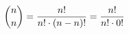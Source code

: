 \documentclass[preview]{standalone}
\begin{document}
\begin{align*}
\special{dvisvgm:raw <g id='unique000'>}\binom{n}{n} = \frac{n!}{n! \cdot (n-n)!} = \frac{n!}{n! \cdot 0!}\special{dvisvgm:raw </g>}
\end{align*}
\end{document}
